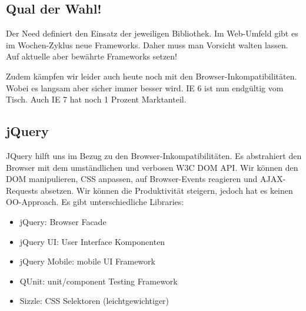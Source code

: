\subsection{Qual der Wahl!}
Der Need definiert den Einsatz der jeweiligen Bibliothek. Im Web-Umfeld gibt es im Wochen-Zyklus neue Frameworks. Daher muss man Vorsicht walten lassen. Auf aktuelle aber bewährte Frameworks setzen!

Zudem kämpfen wir leider auch heute noch mit den Browser-Inkompatibilitäten. Wobei es langsam aber sicher immer besser wird. IE 6 ist nun endgültig vom Tisch. Auch IE 7 hat noch 1 Prozent Marktanteil.

\subsection{jQuery}
JQuery hilft uns im Bezug zu den Browser-Inkompatibilitäten. Es abstrahiert den Browser mit dem umständlichen und verbosen W3C DOM API. Wir können den DOM manipulieren, CSS anpassen, auf Browser-Events reagieren und AJAX-Requests absetzen. Wir können die Produktivität steigern, jedoch hat es keinen OO-Approach. Es gibt unterschiedliche Libraries:

\begin{itemize}
\item jQuery: Browser Facade
\item jQuery UI: User Interface Komponenten
\item jQuery Mobile: mobile UI Framework
\item QUnit: unit/component Testing Framework
\item Sizzle: CSS Selektoren (leichtgewichtiger)	
\end{itemize}

